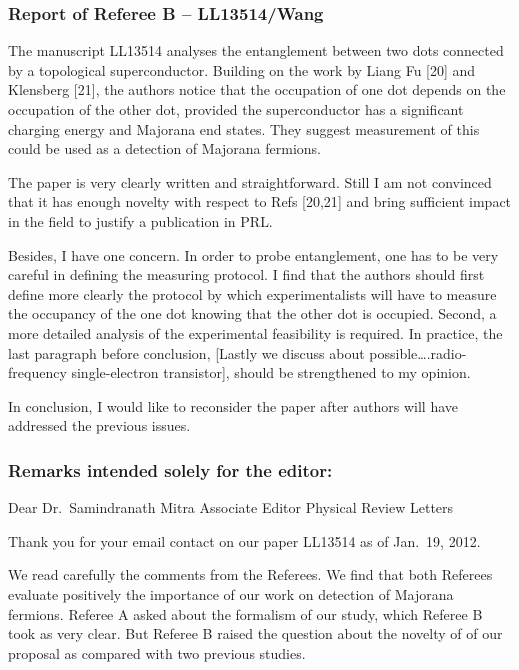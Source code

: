 \documentclass[11pt]{article}
\begin{document}
\hypertarget{report-of-referee-b-ll13514wang}{%
\subsubsection{Report of Referee B --
LL13514/Wang}\label{report-of-referee-b-ll13514wang}}

The manuscript LL13514 analyses the entanglement between two dots
connected by a topological superconductor. Building on the work by Liang
Fu {[}20{]} and Klensberg {[}21{]}, the authors notice that the
occupation of one dot depends on the occupation of the other dot,
provided the superconductor has a significant charging energy and
Majorana end states. They suggest measurement of this could be used as a
detection of Majorana fermions.

The paper is very clearly written and straightforward. Still I am not
convinced that it has enough novelty with respect to Refs {[}20,21{]}
and bring sufficient impact in the field to justify a publication in
PRL.

Besides, I have one concern. In order to probe entanglement, one has to
be very careful in defining the measuring protocol. I find that the
authors should first define more clearly the protocol by which
experimentalists will have to measure the occupancy of the one dot
knowing that the other dot is occupied. Second, a more detailed analysis
of the experimental feasibility is required. In practice, the last
paragraph before conclusion, {[}Lastly we discuss about
possible\ldots{}.radio-frequency single-electron transistor{]}, should
be strengthened to my opinion.

In conclusion, I would like to reconsider the paper after authors will
have addressed the previous issues.

\hypertarget{remarks-intended-solely-for-the-editor}{%
\subsubsection{Remarks intended solely for the
editor:}\label{remarks-intended-solely-for-the-editor}}

Dear Dr.~Samindranath Mitra Associate Editor Physical Review Letters

Thank you for your email contact on our paper LL13514 as of Jan.~19,
2012.

We read carefully the comments from the Referees. We find that both
Referees evaluate positively the importance of our work on detection of
Majorana fermions. Referee A asked about the formalism of our study,
which Referee B took as very clear. But Referee B raised the question
about the novelty of of our proposal as compared with two previous
studies.
\end{document}
